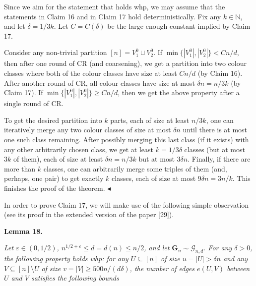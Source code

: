 Since we aim for the statement that holds whp, we may assume that the statements in Claim 16 and in Claim 17 hold deterministically. Fix any $k\in\mathbb{N}$, and let $\delta=1/3k$. Let $C=C(\delta)$ be the large enough constant implied by Claim 17.\par




Consider any non-trivial partition $[n]=V_{1}^{0}\sqcup V_{2}^{0}$. If $\min\{|V_{1}^{0}|,|V_{2}^{0}|\}<Cn/d$, then after one round of CR (and coarsening), we get a partition into two colour classes where both of the colour classes have size at least $Cn/d$ (by Claim 16). After another round of CR, all colour classes have size at most $\delta n=n/3k$ (by Claim 17). If $\min\{|V_{1}^{0}|,|V_{2}^{0}|\}\geq Cn/d$, then we get the above property after a single round of CR.\par




To get the desired partition into $k$ parts, each of size at least $n/3k$, one can iteratively merge any two colour classes of size at most $\delta n$ until there is at most one such class remaining. After possibly merging this last class (if it exists) with any other arbitrarily chosen class, we get at least $k=1/3\delta$ classes (but at most $3k$ of them), each of size at least $\delta n=n/3k$ but at most $3\delta n$. Finally, if there are more than $k$ classes, one can arbitrarily merge some triples of them (and, perhaps, one pair) to get exactly $k$ classes, each of size at most $9\delta n=3n/k$. This finishes the proof of the theorem.
$\blacktriangleleft$\par




In order to prove Claim 17, we will make use of the following simple observation (see its proof in the extended version of the paper [29]).\par





\par\medskip\noindent\textbf{
\textbf{Lemma 18}\textbf{.}
}\par



\emph{Let $\varepsilon\in(0,1/2)$, $n^{1/2+\varepsilon}\leq d=d(n)\leq n/2$, and let $\mathbf{G}_{n}\sim\mathcal{G}_{n,d}$.
For any $\delta>0$, the following property holds whp: for any $U\subseteq[n]$ of size $u=|U|>\delta n$ and any $V\subseteq[n]\setminus U$ of size $v=|V|\geq 500n/(d\delta)$, the number of edges $e(U,V)$ between $U$ and $V$ satisfies the following bounds}\par


